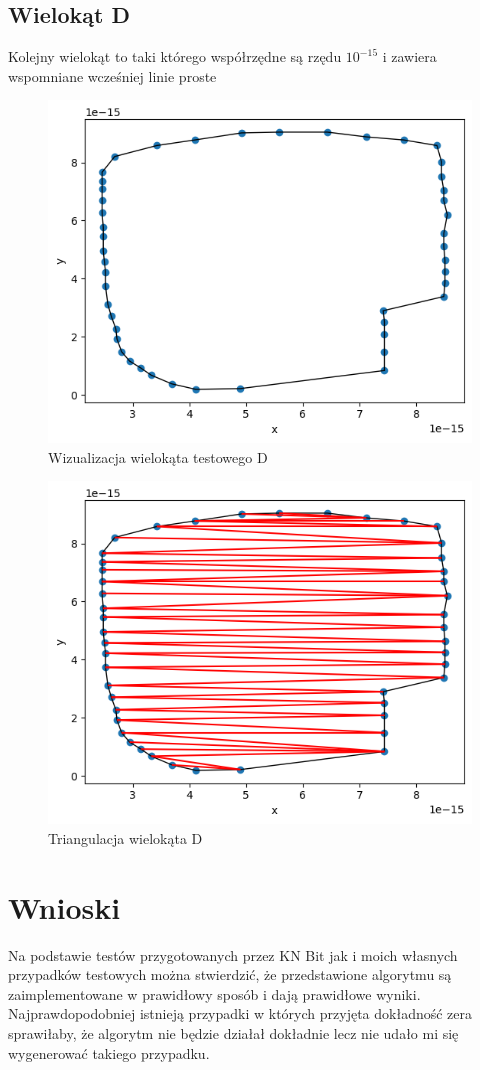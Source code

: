 \documentclass[a4paper]{article}
\begin{document}
    \subsection{Wielokąt D}
    Kolejny wielokąt to taki którego współrzędne są rzędu $10^{-15}$ i zawiera wspomniane wcześniej
    linie proste
    \begin{figure}[H]
        \centering
        \includegraphics[width=.65\textwidth]{test_d_poly.png}
        \caption{Wizualizacja wielokąta testowego D}
        \label{fig:test_d_poly}
    \end{figure}
    \begin{figure}[H]
        \centering
        \includegraphics[width=.65\textwidth]{test_d_tri.png}
        \caption{Triangulacja wielokąta D}
        \label{fig:test_d_tri}
    \end{figure}
    
    

\section{Wnioski}
Na podstawie testów przygotowanych przez KN Bit jak i moich własnych przypadków testowych
można stwierdzić, że przedstawione algorytmu są zaimplementowane w prawidłowy sposób i 
dają prawidłowe wyniki. Najprawdopodobniej istnieją przypadki w których przyjęta dokładność
zera sprawiłaby, że algorytm nie będzie działał dokładnie lecz nie udało mi się wygenerować
takiego przypadku.
\end{document}
